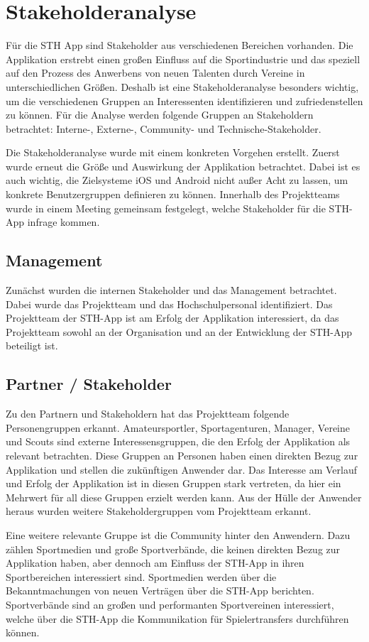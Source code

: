 \chapter{Stakeholderanalyse}
Für die STH App sind Stakeholder aus verschiedenen Bereichen vorhanden. Die Applikation erstrebt einen großen Einfluss auf die Sportindustrie und das speziell auf den Prozess des Anwerbens von neuen Talenten durch Vereine in unterschiedlichen Größen. Deshalb ist eine Stakeholderanalyse besonders wichtig, um die verschiedenen Gruppen an Interessenten identifizieren und zufriedenstellen zu können. Für die Analyse werden folgende Gruppen an Stakeholdern betrachtet: Interne-, Externe-, Community- und Technische-Stakeholder. 

\noindent
Die Stakeholderanalyse wurde mit einem konkreten Vorgehen erstellt. Zuerst wurde erneut die Größe und Auswirkung der Applikation betrachtet.
Dabei ist es auch wichtig, die Zielsysteme iOS und Android nicht außer Acht zu lassen, um konkrete Benutzergruppen definieren zu können. Innerhalb des Projektteams wurde in einem Meeting gemeinsam festgelegt, welche Stakeholder für die STH-App infrage kommen.

\section{Management}
Zunächst wurden die internen Stakeholder und das Management betrachtet.
Dabei wurde das Projektteam und das Hochschulpersonal identifiziert. Das Projektteam der STH-App ist am Erfolg der Applikation interessiert, da das Projektteam sowohl an der Organisation und an der Entwicklung der STH-App beteiligt ist.

\section{Partner / Stakeholder}
Zu den Partnern und Stakeholdern hat das Projektteam folgende Personengruppen erkannt. Amateursportler, Sportagenturen, Manager, Vereine und Scouts sind externe Interessensgruppen, die den Erfolg der Applikation als relevant betrachten. Diese Gruppen an Personen haben einen direkten Bezug zur Applikation und stellen die zukünftigen Anwender dar. Das Interesse am Verlauf und Erfolg der Applikation ist in diesen Gruppen stark vertreten, da hier ein Mehrwert für all diese Gruppen erzielt werden kann. Aus der Hülle der Anwender heraus wurden weitere Stakeholdergruppen vom Projektteam erkannt.

\noindent
Eine weitere relevante Gruppe ist die Community hinter den Anwendern. Dazu zählen Sportmedien und große Sportverbände, die keinen direkten Bezug zur Applikation haben, aber dennoch am Einfluss der STH-App in ihren Sportbereichen interessiert sind. Sportmedien werden über die Bekanntmachungen von neuen Verträgen über die STH-App berichten. Sportverbände sind an großen und performanten Sportvereinen interessiert, welche über die STH-App die Kommunikation für Spielertransfers durchführen können.

